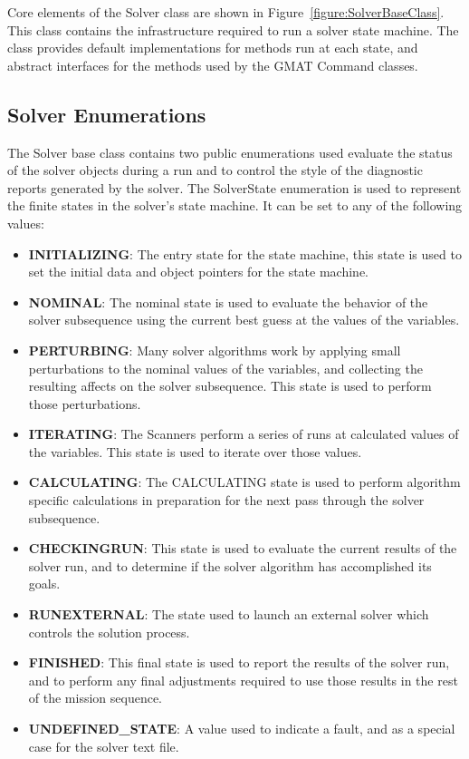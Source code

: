 Core elements of the Solver class are shown in Figure~\ref{figure:SolverBaseClass}.  This class
contains the infrastructure required to run a solver state machine.  The class provides default
implementations for methods run at each state, and abstract interfaces for the methods used by the
GMAT Command classes.

\subsection{Solver Enumerations}

The Solver base class contains two public enumerations used evaluate the status of the solver
objects during a run and to control the style of the diagnostic reports generated by the solver.
The SolverState enumeration is used to represent the finite states in the solver's state machine.
It can be set to any of the following values:

\begin{itemize}
\item \textbf{INITIALIZING}:  The entry state for the state machine, this state is used to set
the initial data and object pointers for the state machine.
\item \textbf{NOMINAL}:  The nominal state is used to evaluate the behavior of the solver
subsequence using the current best guess at the values of the variables.
\item \textbf{PERTURBING}:  Many solver algorithms work by applying small perturbations to the
nominal values of the variables, and collecting the resulting affects on the solver subsequence.
This state is used to perform those perturbations.
\item \textbf{ITERATING}:  The Scanners perform a series of runs at calculated values of the
variables.  This state is used to iterate over those values.
\item \textbf{CALCULATING}:  The CALCULATING state is used to perform algorithm specific
calculations in preparation for the next pass through the solver subsequence.
\item \textbf{CHECKINGRUN}:  This state is used to evaluate the current results of the solver run,
and to determine if the solver algorithm has accomplished its goals.
\item \textbf{RUNEXTERNAL}: The state used to launch an external solver which controls the solution
process.
\item \textbf{FINISHED}:  This final state is used to report the results of the solver run, and to
perform any final adjustments required to use those results in the rest of the mission sequence.
\item \textbf{UNDEFINED\_STATE}:  A value used to indicate a fault, and as a special case for the
solver text file.
\end{itemize}


